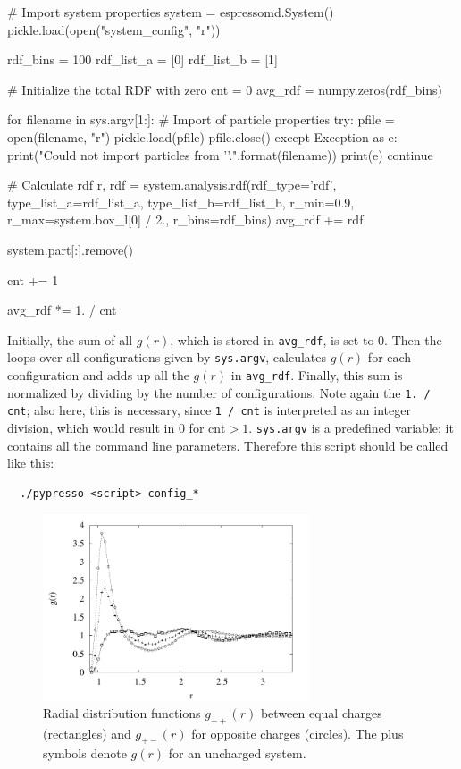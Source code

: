 \documentclass[
a4paper,                        %
11pt,                           %
twoside,                        %
footsepline,                    %
headsepline,                    %
headexclude,                    %
footexclude,                    %
pagesize,                       %
]{scrartcl}
\begin{document}
\begin{tclcode}
# Import system properties
system = espressomd.System()
pickle.load(open("system_config", "r"))

rdf_bins = 100
rdf_list_a = [0]
rdf_list_b = [1]

# Initialize the total RDF with zero
cnt = 0
avg_rdf = numpy.zeros(rdf_bins)

for filename in sys.argv[1:]:
    # Import of particle properties
    try:
        pfile = open(filename, "r")
        pickle.load(pfile)
        pfile.close()
    except Exception as e:
        print("Could not import particles from '{}'.".format(filename))
        print(e)
        continue

    # Calculate rdf
    r, rdf = system.analysis.rdf(rdf_type='rdf', type_list_a=rdf_list_a,
                                 type_list_b=rdf_list_b, r_min=0.9,
                                 r_max=system.box_l[0] / 2., r_bins=rdf_bins)
    avg_rdf += rdf

    system.part[:].remove()

    cnt += 1

avg_rdf *= 1. / cnt
\end{tclcode}

Initially, the sum of all $g(r)$, which is stored in \verb|avg_rdf|,
is set to 0.  Then the loops over all configurations given by
\verb|sys.argv|, calculates $g(r)$ for each configuration and adds up all
the $g(r)$ in \verb|avg_rdf|.  Finally, this sum is normalized by
dividing by the number of configurations. Note again the
\verb|1. / cnt|; also here, this is necessary, since \verb|1 / cnt| is 
interpreted as an integer division, which would result in 0 for $\text{cnt}>1$. 
 \verb|sys.argv| is a predefined variable: it contains all the command line 
parameters. Therefore this script should be called like this:
\begin{verbatim}
  ./pypresso <script> config_*
\end{verbatim}

\begin{figure}[tb]
  \centering
  \includegraphics[width=0.7\textwidth]{figures/nacl-rdf}
  \caption{Radial distribution functions $g_{++}(r)$ between equal
    charges (rectangles) and $g_{+-}(r)$ for opposite charges
    (circles). The plus symbols denote $g(r)$ for an uncharged
    system.}
  \label{fig:rdf}
\end{figure}
\end{document}
